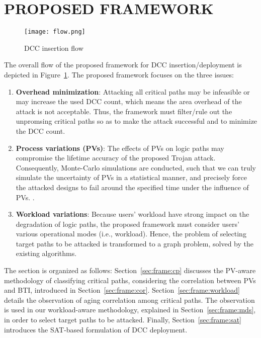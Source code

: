 \section{PROPOSED FRAMEWORK}
\label{sec:frame}
\begin{figure}
	\centering
	\texttt{[image: flow.png]}
	\caption{DCC insertion flow}
	\label{fig:flow}
\end{figure}
The overall flow of the proposed framework for DCC insertion/deployment is depicted in Figure~\ref{fig:flow}. The proposed framework focuses on the three issues: 
\begin{enumerate}[leftmargin=*]
	\item \textbf{Overhead minimization}: Attacking all critical paths may be infeasible or may increase the used DCC count, which means the area overhead of the attack is not acceptable. Thus, the framework must filter/rule out the unpromsing critical paths so as to make the attack successful and to minimize the DCC count.
	\item \textbf{Process variations (PVs)}: The effects of PVs on logic paths may compromise the lifetime accuracy of the proposed Trojan attack. Consequently, Monte-Carlo simulations are conducted, such that we can truly simulate the uncertainty of PVs in a statistical manner, and precisely force the attacked designs to fail around the specified time under the influence of PVs.  .
	\item \textbf{Workload variations}: Because users' workload have strong impact on the degradation of logic paths, the proposed framework must consider users' various operational modes (i.e., workload). Hence, the problem of selecting target paths to be attacked is transformed to a graph problem, solved by the existing algorithms. 
\end{enumerate}


The section is organized as follows: Section~\ref{sec:frame:cp} discusses the PV-aware methodology of classifying critical paths, considering the correlation between PVs and BTI, introduced in Section~\ref{sec:frame:cor}. Section~\ref{sec:frame:workload} details the observation of aging correlation among critical paths. The observation is used in our workload-aware methodology, explained in Section~\ref{sec:frame:mds}, in order to select target paths to be attacked. Finally, Section~\ref{sec:frame:sat} introduces the SAT-based formulation of DCC deployment.
